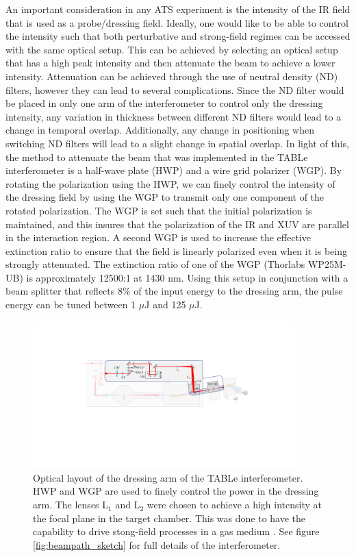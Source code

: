 An important consideration in any ATS experiment is the intensity of the IR field that is used as a probe/dressing field. Ideally, one would like to be able to control the intensity such that both perturbative and strong-field regimes can be accessed with the same optical setup.  This can be achieved by selecting an optical setup that has a high peak intensity and then attenuate the beam 
to achieve a lower intensity.  Attenuation can be achieved through the use of neutral density (ND) filters, however they can lead to several complications.  Since the ND filter would be placed in only one arm of the interferometer to control only the dressing intensity, any variation in thickness between different ND filters would lead to a change in temporal overlap.  Additionally, any change in positioning when switching ND filters will lead to a slight change in spatial overlap. In light of this, the method to attenuate the beam that was implemented in the TABLe interferometer is a half-wave plate (HWP) and a wire grid polarizer (WGP).  By rotating the polarization using the HWP, we can finely control the intensity  of the dressing field by using the WGP to transmit only one component of the rotated polarization.  The WGP is set such that the initial polarization is maintained, and this insures that the polarization of the IR and XUV are parallel in the interaction region.  A second WGP is used to increase the effective extinction ratio to ensure that the field is linearly polarized even when it is being strongly attenuated.  The extinction ratio of one of the WGP (Thorlabs WP25M-UB) is approximately 12500:1 at 1430 nm.  Using this setup in conjunction with a beam splitter that reflects 8\% of the input energy to the dressing arm, the pulse energy can be tuned between 1 $\mu$J and 125 $\mu$J.

\begin{figure}
	\centering
	\includegraphics[width=0.9\textwidth]{figures/Beamline/dressing_arm.pdf}
	\caption{Optical layout of the dressing arm of the TABLe interferometer. HWP and WGP are used to finely control the power in the dressing arm.  The lenses L$_1$ and L$_2$ were chosen to achieve a high intensity at the focal plane in the target chamber.  This was done to have the capability to drive stong-field processes in a gas medium \cite{kiesewetterDynamicsNearThresholdAttosecond2019}.  See figure \ref{fig:beampath_sketch} for full details of the interferometer.}
	\label{fig:dressing_arm}
\end{figure}

